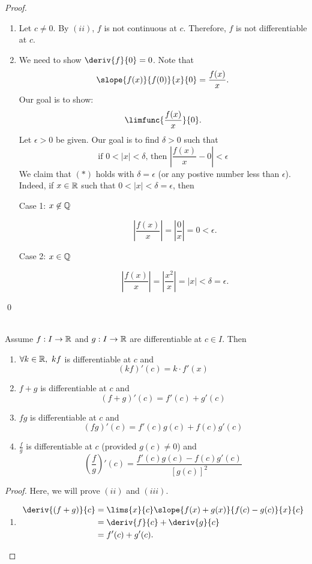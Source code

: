 \begin{proof}
\begin{enumerate}[$(i)$]
        \item Let $c \not = 0$. By $(ii)$, $f$ is not continuous at $c$. Therefore, $f$ is not differentiable at $c$.
        
        \item We need to show $\deriv{f}{0} = 0$. Note that
        $$\slope{f(x)}{f(0)}{x}{0} = \frac{f(x)}{x}.$$
        Our goal is to show:
        $$\limfunc{\frac{f(x)}{x}}{0}.$$
        Let $\epsilon > 0$ be given. Our goal is to find $\delta > 0$ such that
        \begin{equation*}
            \text{if $0 < |x| < \delta$, then $\left|\frac{f(x)}{x}- 0\right| < \epsilon$} \tag{$*$}
        \end{equation*}
        We claim that $(*)$ holds with $\delta = \epsilon$ (or any postive number less than $\epsilon$). Indeed, if $x \in \mathbb{R}$ such that $0 < |x| < \delta = \epsilon$, then
        \begin{description}
            \item[Case 1: $x \not \in \mathbb{Q}$]
            $$\left|\frac{f(x)}{x}\right| = \left|\frac{0}{x}\right| = 0 < \epsilon.$$
            \item[Case 2: $x \in \mathbb{Q}$]
            $$\left|\frac{f(x)}{x}\right| = \left|\frac{x^2}{x}\right| = |x| < \delta = \epsilon.$$
        \end{description}
    \end{enumerate}
    \qed
\end{proof}

\begin{theorem} \leavevmode \\
    Assume $f: I \to \mathbb{R}$ and $g: I \to \mathbb{R}$ are differentiable at $c \in I$. Then
    \begin{enumerate}[$(i)$]
        \item $\forall k \in \mathbb{R}, ~kf$ is differentiable at $c$ and
        $$(kf)'(c) = k \cdot f'(x)$$
        \item $f+g$ is differentiable at $c$ and 
        $$(f+g)'(c) = f'(c) + g'(c)$$
        \item $fg$ is differentiable at $c$ and 
        $$(fg)'(c) = f'(c)g(c) + f(c)g'(c)$$
        \item  $\frac{f}{g}$ is differentiable at $c$ (provided $g(c) \not = 0$) and 
        $$\left(\frac{f}{g}\right)'(c) = \frac{f'(c)g(c)-f(c)g'(c)}{[g(c)]^2}$$
    \end{enumerate}
\end{theorem}

\begin{proof}
    Here, we will prove $(ii)$ and $(iii)$.
    \begin{enumerate}[$(ii)$]
        \item \begin{align*}
            \deriv{(f+g)}{c} &= \lims{x}{c}\slope{f(x) + g(x)}{f(c)-g(c)}{x}{c} \\
            &= \deriv{f}{c} + \deriv{g}{c} \\
            &= f'(c) + g'(c).
        \end{align*}
    \end{enumerate}
\end{proof}